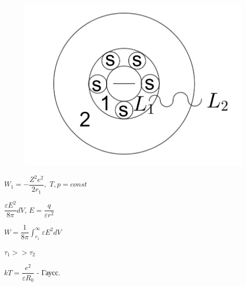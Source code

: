 \begin{lecture}
\begin{lecSection}
\begin{figure}[H]
\begin{minipage}[h]{0.49\linewidth}
			\end{minipage}
			\hfill
			\begin{minipage}[h]{0.49\linewidth}
				\centering\includegraphics[width=\linewidth]{lecture_05/pic5}

			\end{minipage}
			
		\end{figure}
	
	\begin{center}
	$W_1 = - \dfrac{Z^2e^2}{2r_1},$ $T,p = const$		
	\par $\dfrac{\varepsilon E^2}{8 \pi} dV$, $E = \dfrac{q}{\varepsilon r^2}$
	\par $W = \dfrac{1}{8 \pi} \int_{r_1}^{\infty} \varepsilon E^2 dV$
	\par $\tau_1 >> \tau_2$
	\par $kT = \dfrac{e^2}{\varepsilon R_0}$ - Гаусс.
	\end{center}
	
	\end{lecSection}
	
\end{lecture}
